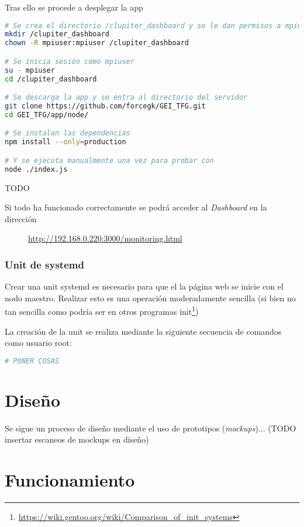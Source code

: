 Tras ello se procede a desplegar la app
\begin{lstlisting}[language=bash]
# Se crea el directorio /clupiter_dashboard y se le dan permisos a mpiuser
mkdir /clupiter_dashboard
chown -R mpiuser:mpiuser /clupiter_dashboard

# Se inicia sesión como mpiuser
su - mpiuser
cd /clupiter_dashboard

# Se descarga la app y se entra al directorio del servidor
git clone https://github.com/forcegk/GEI_TFG.git
cd GEI_TFG/app/node/

# Se instalan las dependencias
npm install --only=production

# Y se ejecuta manualmente una vez para probar con
node ./index.js
\end{lstlisting}

TODO

Si todo ha funcionado correctamente se podrá acceder al \textit{Dashboard} en la dirección

\begin{figure}[H]
    \vspace{0.3cm}
    \centering
    \url{http://192.168.0.220:3000/monitoring.html}
\end{figure}


\subsubsection{Unit de systemd}
Crear una unit systemd es necesario para que el la página web se inicie con el nodo maestro. Realizar esto es una operación moderadamente sencilla (si bien no tan sencilla como podría ser en otros programas init\footnote{\url{https://wiki.gentoo.org/wiki/Comparison_of_init_systems}}) 

La creación de la unit se realiza mediante la siguiente secuencia de comandos como usuario root:

\begin{lstlisting}[language=bash]
# PONER COSAS

\end{lstlisting}


\section{Diseño}
Se sigue un proceso de diseño mediante el uso de prototipos (\textit{mockups})... (TODO insertar escaneos de mockups en diseño)

\section{Funcionamiento}
